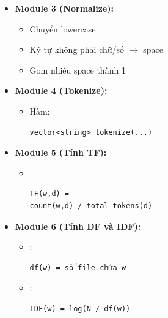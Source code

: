 \begin{itemize}
\begin{itemize}
        \begin{itemize}
            \item Hàm:
\begin{lstlisting}
readLines(path, vector<string>&)
\end{lstlisting}
        \end{itemize}

        \item \textbf{Module 3 (Normalize):}

        \begin{itemize}
            \item Chuyển lowercase
            \item Ký tự không phải chữ/số
            $\rightarrow$
            space
            \item Gom nhiều space thành 1
        \end{itemize}

        \item \textbf{Module 4 (Tokenize):}

        \begin{itemize}
            \item Hàm:
\begin{lstlisting}
vector<string> tokenize(...)
\end{lstlisting}
        \end{itemize}

        \item \textbf{Module 5 (Tính TF):}

        \begin{itemize}
            \item:
\begin{lstlisting}
TF(w,d) =
count(w,d) / total_tokens(d)
\end{lstlisting}
        \end{itemize}

        \item \textbf{Module 6 (Tính DF và IDF):}

        \begin{itemize}
            \item:
\begin{lstlisting}
df(w) = số file chứa w
\end{lstlisting}

            \item:
\begin{lstlisting}
IDF(w) = log(N / df(w))
\end{lstlisting}


\end{itemize}
\end{itemize}
\end{itemize}

